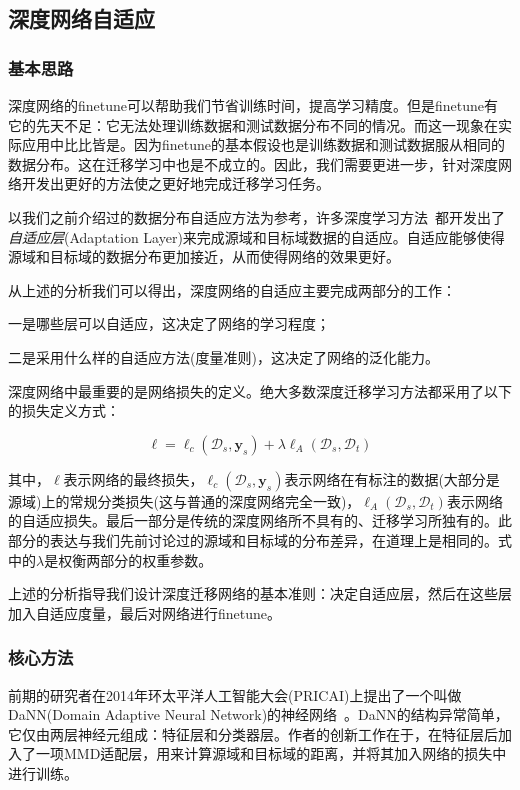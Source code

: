 \subsection{深度网络自适应}

\subsubsection{基本思路}

深度网络的finetune可以帮助我们节省训练时间，提高学习精度。但是finetune有它的先天不足：它无法处理训练数据和测试数据分布不同的情况。而这一现象在实际应用中比比皆是。因为finetune的基本假设也是训练数据和测试数据服从相同的数据分布。这在迁移学习中也是不成立的。因此，我们需要更进一步，针对深度网络开发出更好的方法使之更好地完成迁移学习任务。

以我们之前介绍过的数据分布自适应方法为参考，许多深度学习方法~\cite{tzeng2014deep,long2015learning}都开发出了\textit{自适应层}(Adaptation Layer)来完成源域和目标域数据的自适应。自适应能够使得源域和目标域的数据分布更加接近，从而使得网络的效果更好。

从上述的分析我们可以得出，深度网络的自适应主要完成两部分的工作：

一是哪些层可以自适应，这决定了网络的学习程度；

二是采用什么样的自适应方法(度量准则)，这决定了网络的泛化能力。

深度网络中最重要的是网络损失的定义。绝大多数深度迁移学习方法都采用了以下的损失定义方式：

\begin{equation}
	\ell = \ell_c(\mathcal{D}_s,\mathbf{y}_s) + \lambda \ell_A(\mathcal{D}_s,\mathcal{D}_t)
\end{equation}

其中，$\ell$表示网络的最终损失，$\ell_c(\mathcal{D}_s,\mathbf{y}_s)$表示网络在有标注的数据(大部分是源域)上的常规分类损失(这与普通的深度网络完全一致)，$\ell_A(\mathcal{D}_s,\mathcal{D}_t)$表示网络的自适应损失。最后一部分是传统的深度网络所不具有的、迁移学习所独有的。此部分的表达与我们先前讨论过的源域和目标域的分布差异，在道理上是相同的。式中的$\lambda$是权衡两部分的权重参数。

上述的分析指导我们设计深度迁移网络的基本准则：决定自适应层，然后在这些层加入自适应度量，最后对网络进行finetune。

\subsubsection{核心方法}

前期的研究者在2014年环太平洋人工智能大会(PRICAI)上提出了一个叫做DaNN(Domain Adaptive Neural Network)的神经网络~\cite{ghifary2014domain}。DaNN的结构异常简单，它仅由两层神经元组成：特征层和分类器层。作者的创新工作在于，在特征层后加入了一项MMD适配层，用来计算源域和目标域的距离，并将其加入网络的损失中进行训练。

